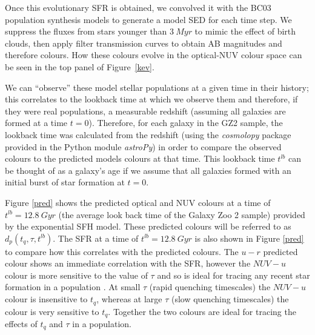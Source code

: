\documentclass{mn2e}
\begin{document}
Once this evolutionary SFR is obtained, we convolved it with the BC03 population synthesis models to generate a model SED for each time step. We suppress the fluxes from stars younger than $3~Myr$ to mimic the effect of birth clouds, then apply filter transmission curves to obtain AB magnitudes and therefore colours. How these colours evolve in the optical-NUV colour space can be seen in the top panel of Figure~\ref{kev}.


We can ``observe'' these model stellar populations at a given time in their history; this correlates to the lookback time at which we observe them and therefore, if they were real populations, a measurable redshift (assuming all galaxies are formed at a time $t=0$). Therefore, for each galaxy in the GZ2 sample, the lookback time was calculated from the redshift (using the \emph{cosmolopy} package provided in the Python module \emph{astroPy}) in order to compare the observed colours to the predicted models colours at that time. This lookback time $t^{lb}$ can be thought of as a galaxy's age if we assume that all galaxies formed with an initial burst of star formation at $t=0$. 

Figure \ref{pred} shows the predicted optical and NUV colours at a time of $t^{lb} = 12.8 ~Gyr$ (the average look back time of the Galaxy Zoo 2 sample) provided by the exponential SFH model. These predicted colours will be referred to as $d_{p}(t_{q}, \tau, t^{lb})$. The SFR at a time of $t^{lb}=12.8~Gyr$ is also shown in Figure \ref{pred} to compare how this correlates with the predicted colours. The $u-r$ predicted colour shows an immediate correlation with the SFR, however the $NUV-u$ colour is more sensitive to the value of $\tau$ and so is ideal for tracing any recent star formation in a population . At small $\tau$ (rapid quenching timescales) the $NUV-u$ colour is insensitive to $t_{q}$, whereas at large $\tau$ (slow quenching timescales) the colour is very sensitive to $t_{q}$. Together the two colours are ideal for tracing the effects of $t_{q}$ and $\tau$ in a population. 
\end{document}
